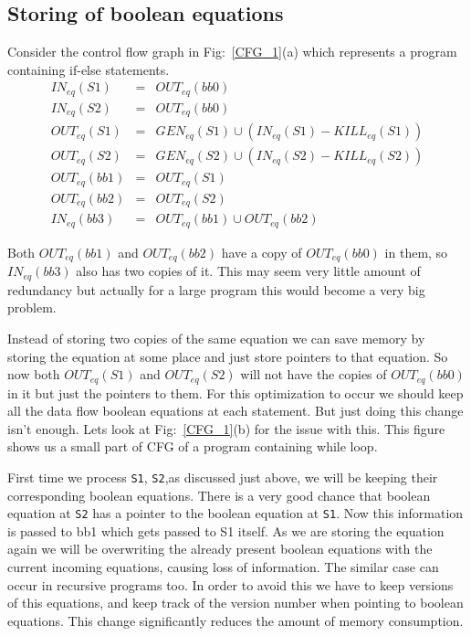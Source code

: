\subsection{Storing of boolean equations}
Consider the control flow graph in Fig:~\ref{CFG_1}(a) which represents a program containing if-else statements. 
\begin{eqnarray*}
 {IN}_{eq}(S1) &=& {OUT}_{eq}(bb0) \\
 {IN}_{eq}(S2) &=& {OUT}_{eq}(bb0) \\
{OUT}_{eq}(S1) &=& {GEN}_{eq}(S1) \cup ( {IN}_{eq}(S1) - {KILL}_{eq}(S1)  ) \\
{OUT}_{eq}(S2)  &=& {GEN}_{eq}(S2) \cup ( {IN}_{eq}(S2) - {KILL}_{eq}(S2)  ) \\
{OUT}_{eq}(bb1) &=& {OUT}_{eq}(S1) \\
{OUT}_{eq}(bb2) &=& {OUT}_{eq}(S2) \\
{IN}_{eq}(bb3) &=& {OUT}_{eq}(bb1) \cup {OUT}_{eq}(bb2)
\end{eqnarray*}

Both ${OUT}_{eq}(bb1)$ and ${OUT}_{eq}(bb2)$ have a copy of ${OUT}_{eq}(bb0)$ in them, so ${IN}_{eq}(bb3)$  also has two copies of it.
This may seem very little amount of redundancy but actually for a large program this would become a very big problem.

Instead of storing two copies of the same equation we can save memory by storing the equation at some place and just
store pointers to that equation. So now both ${OUT}_{eq}(S1)$ and ${OUT}_{eq}(S2)$ will not have the
copies of ${OUT}_{eq}(bb0)$ in it  but just the pointers to them.
For this optimization to occur we should keep all the data flow boolean equations at each statement.
But just doing this change isn't enough. Lets look at  Fig:~\ref{CFG_1}(b) for the issue with this. This figure shows us a small part
of CFG of a program containing while loop.

First time we process {\tt S1}, {\tt S2},as discussed just above, we will be keeping their corresponding boolean equations. There is a very good 
chance that 
boolean equation at {\tt S2} has a pointer to the boolean equation at {\tt S1}. Now this information is passed to bb1 which gets passed to S1 itself.
As we are storing the equation again we will be overwriting the already present boolean equations with the current incoming equations, causing loss of information. The similar case can occur in recursive programs too. In order to avoid this we have to keep versions
of this equations, and keep track of the version number when pointing to boolean equations.
This change significantly reduces the amount of memory consumption.

